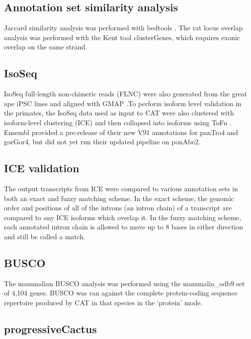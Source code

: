 \documentclass[fleqn,10pt]{wlscirep}
\begin{document}
\subsection*{Annotation set similarity analysis}

Jaccard similarity analysis was performed with bedtools \cite{quinlan2010bedtools}. The rat locus overlap analysis was performed with the Kent tool clusterGenes, which requires exonic overlap on the same strand.

\subsection*{IsoSeq}

IsoSeq full-length non-chimeric reads (FLNC) were also generated from the great ape iPSC lines and aligned with GMAP \cite{wu2005gmap}.To perform isoform level validation in the primates, the IsoSeq data used as input to CAT were also clustered with isoform-level clustering (ICE) and then collapsed into isoforms using ToFu \cite{gordon2015widespread}. Ensembl provided a pre-release of their new V91 annotations for panTro4 and gorGor4, but did not yet run their updated pipeline on ponAbe2.

\subsection*{ICE validation}

The output transcripts from ICE were compared to various annotation sets in both an exact and fuzzy matching scheme. In the exact scheme, the genomic order and positions of all of the introns (an intron chain) of a transcript are compared to any ICE isoforms which overlap it. In the fuzzy matching scheme, each annotated intron chain is allowed to move up to 8 bases in either direction and still be called a match.

\subsection*{BUSCO}

The mammalian BUSCO analysis was performed using the mammalia\_odb9 set of 4,104 genes. BUSCO was ran against the complete protein-coding sequence repertoire produced by CAT in that species in the `protein' mode.

\subsection*{progressiveCactus}
\end{document}
